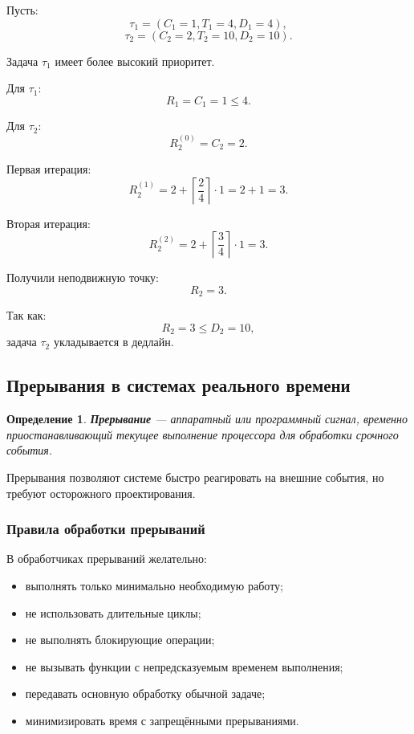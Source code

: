 \documentclass[12pt,a4paper]{article}
\newtheorem{definition}{Определение}
\begin{document}
Пусть:
\[
    \tau_1 = (C_1=1, T_1=4, D_1=4),
\]
\[
    \tau_2 = (C_2=2, T_2=10, D_2=10).
\]

Задача $\tau_1$ имеет более высокий приоритет.

Для $\tau_1$:
\[
    R_1 = C_1 = 1 \leq 4.
\]

Для $\tau_2$:
\[
    R_2^{(0)} = C_2 = 2.
\]

Первая итерация:
\[
    R_2^{(1)}
    =
    2 + \left\lceil \frac{2}{4} \right\rceil \cdot 1
    =
    2 + 1 = 3.
\]

Вторая итерация:
\[
    R_2^{(2)}
    =
    2 + \left\lceil \frac{3}{4} \right\rceil \cdot 1
    =
    3.
\]

Получили неподвижную точку:
\[
    R_2 = 3.
\]

Так как:
\[
    R_2 = 3 \leq D_2 = 10,
\]
задача $\tau_2$ укладывается в дедлайн.

\subsection{Прерывания в системах реального времени}

\begin{definition}
\textbf{Прерывание} --- аппаратный или программный сигнал, временно приостанавливающий текущее выполнение процессора для обработки срочного события.
\end{definition}

Прерывания позволяют системе быстро реагировать на внешние события, но требуют осторожного проектирования.

\subsubsection{Правила обработки прерываний}

В обработчиках прерываний желательно:
\begin{itemize}
    \item выполнять только минимально необходимую работу;
    \item не использовать длительные циклы;
    \item не выполнять блокирующие операции;
    \item не вызывать функции с непредсказуемым временем выполнения;
    \item передавать основную обработку обычной задаче;
    \item минимизировать время с запрещёнными прерываниями.
\end{itemize}
\end{document}
